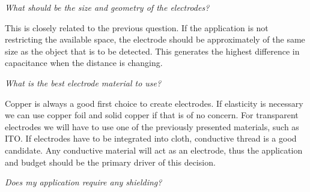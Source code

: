 \textit{What should be the size and geometry of the electrodes?}


This is closely related to the previous question. If the application is not restricting the available space, the electrode should be approximately of the same size as the object that is to be detected. This generates the highest difference in capacitance when the distance is changing. 


\textit{What is the best electrode material to use?}


Copper is always a good first choice to create electrodes. If elasticity is necessary we can use copper foil and solid copper if that is of no concern. For transparent electrodes we will have to use one of the previously presented materials, such as ITO. If electrodes have to be integrated into cloth, conductive thread is a good candidate. Any conductive material will act as an electrode, thus the application and budget should be the primary driver of this decision.


\textit{Does my application require any shielding?}


